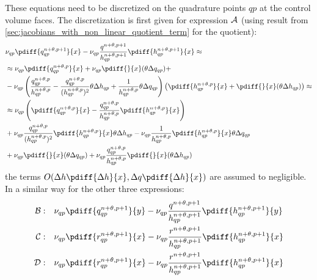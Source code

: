 These equations need to be  discretized on the quadrature points $qp$ at the control volume faces.
The discretization is first  given for expression $\cal{A}$ (using result from \autoref{sec:jacobians_with_non_linear_quotient_term} for the quotient):
\begin{align}
     & \nu_{qp} \pdiff{q^{n+\theta, p+1}_{qp}}{x}  -
    \nu_{qp} \frac{q^{n+\theta, p+1}}{h^{n+\theta, p+1}_{qp}}\pdiff{ h^{n+\theta, p+1}_{qp}}{x} \approx
    \\
    & \approx
    \nu_{qp} \pdiff{q^{n+\theta,p}_{qp}}{x} + \nu_{qp} \pdiff{}{x}(\theta \Delta q_{qp}) +
    \nonumber \\
    &- \nu_{qp} \left(
    \frac{q^{n+\theta,p}_{qp}}{h^{n+\theta,p}_{qp}} - \frac{q^{n+\theta,p}_{qp}}{(h^{n+\theta,p}_{qp})^2} \theta \Delta h_{qp} +
    \frac{1}{h^{n+\theta,p}_{qp}} \theta \Delta q_{qp}
    \right)\left(  \pdiff{h^{n+\theta,p}_{qp}}{x} +   \pdiff{}{x}(\theta \Delta h_{qp}) \right) \approx
    \\
    & \approx
    \nu_{qp} \left( \pdiff{q^{n+\theta,p}_{qp}}{x} - \frac{q^{n+\theta,p}_{qp}}{h^{n+\theta,p}_{qp}} \pdiff{h^{n+\theta,p}_{qp}}{x} \right)
    \\
& + \nu_{qp}  \frac{q^{n+\theta,p}_{qp}}{(h^{n+\theta,p}_{qp})^2} \pdiff{h^{n+\theta,p}_{qp}}{x}  \theta \Delta h_{qp}
- \nu_{qp} \frac{1}{h^{n+\theta,p}_{qp}}  \pdiff{h^{n+\theta,p}_{qp}}{x} \theta \Delta q_{qp}
    \\
    & +
    \nu_{qp} \pdiff{}{x}(\theta \Delta q_{qp}) +
    \nu_{qp} \frac{q^{n+\theta,p}_{qp}}{h^{n+\theta,p}_{qp}} \pdiff{}{x}(\theta \Delta h_{qp})
\end{align}
the terms $O(\Delta h\pdiff{\Delta h}{x}, \Delta q \pdiff{\Delta h}{x})$ are assumed to negligible.
In a similar way for the other three expressions:
\begin{align}
    \cal{B}: & \quad \nu_{qp} \pdiff{q^{n+\theta, p+1}_{qp}}{y}  -
\nu_{qp} \frac{q^{n+\theta, p+1}}{h^{n+\theta, p+1}_{qp}}\pdiff{ h^{n+\theta, p+1}_{qp}}{y}
\\
    \cal{C}: & \quad \nu_{qp} \pdiff{r^{n+\theta, p+1}_{qp}}{x}  -
\nu_{qp} \frac{r^{n+\theta, p+1}}{h^{n+\theta, p+1}_{qp}}\pdiff{ h^{n+\theta, p+1}_{qp}}{x}
\\
    \cal{D}: & \quad \nu_{qp} \pdiff{r^{n+\theta, p+1}_{qp}}{x}  -
\nu_{qp} \frac{r^{n+\theta, p+1}}{h^{n+\theta, p+1}_{qp}}\pdiff{ h^{n+\theta, p+1}_{qp}}{x}
\end{align}



